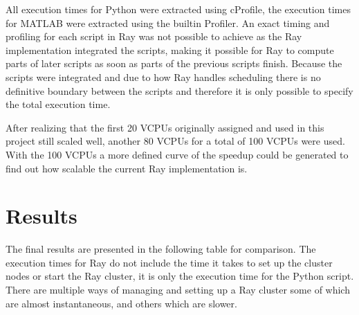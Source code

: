 \documentclass[12pt, a4paper]{article}
\begin{document}
All execution times for Python were extracted using cProfile, the execution times for MATLAB were extracted using the builtin Profiler.
An exact timing and profiling for each script in Ray was not possible to achieve as the Ray implementation integrated the scripts, making it possible for Ray to compute parts of later scripts as soon as parts of the previous scripts finish.
Because the scripts were integrated and due to how Ray handles scheduling there is no definitive boundary between the scripts and therefore it is only possible to specify the total execution time.

After realizing that the first 20 VCPUs originally assigned and used in this project still scaled well, another 80 VCPUs for a total of 100 VCPUs were used. With the 100 VCPUs a more defined curve of the speedup could be generated to find out how scalable the current Ray implementation is.

\section{Results}

The final results are presented in the following table for comparison.
The execution times for Ray do not include the time it takes to set up the cluster nodes or start the Ray cluster, it is only the execution time for the Python script.
There are multiple ways of managing and setting up a Ray cluster some of which are almost instantaneous, and others which are slower. 
\end{document}

